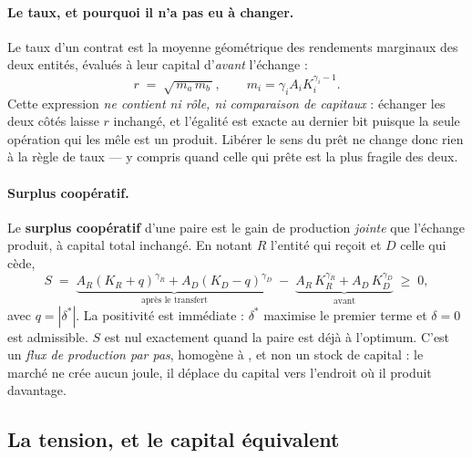 \paragraph{Le taux, et pourquoi il n'a pas eu à changer.} Le taux d'un
contrat est la moyenne géométrique des rendements marginaux des deux entités,
évalués à leur capital d'\emph{avant} l'échange :
\begin{equation}
r \;=\; \sqrt{\,m_a\,m_b\,},
\qquad m_i = \gamma_i A_i K_i^{\gamma_i - 1}.
\label{eq:taux}
\end{equation}
Cette expression \emph{ne contient ni rôle, ni comparaison de capitaux} :
échanger les deux côtés laisse $r$ inchangé, et l'égalité est exacte au
dernier bit puisque la seule opération qui les mêle est un produit. Libérer
le sens du prêt ne change donc rien à la règle de taux --- y compris quand
celle qui prête est la plus fragile des deux.

\paragraph{Surplus coopératif.} Le \textbf{surplus coopératif} d'une paire
est le gain de production \emph{jointe} que l'échange produit, à capital
total inchangé. En notant $R$ l'entité qui reçoit et $D$ celle qui cède,
\begin{equation}
S \;=\;
\underbrace{A_R (K_R+q)^{\gamma_R} + A_D (K_D-q)^{\gamma_D}}
          _{\text{après le transfert}}
\;-\;
\underbrace{A_R\,K_R^{\gamma_R} + A_D\,K_D^{\gamma_D}}_{\text{avant}}
\;\ge\; 0 ,
\label{eq:surplus}
\end{equation}
avec $q = |\delta^{*}|$. La positivité est immédiate : $\delta^{*}$ maximise
le premier terme et $\delta = 0$ est admissible. $S$ est nul exactement quand
la paire est déjà à l'optimum. C'est un \emph{flux de production par pas},
homogène à , et non un stock de capital : le marché ne crée
aucun joule, il déplace du capital vers l'endroit où il produit davantage.

\subsection{La tension, et le capital équivalent}
\label{sec:tension}


